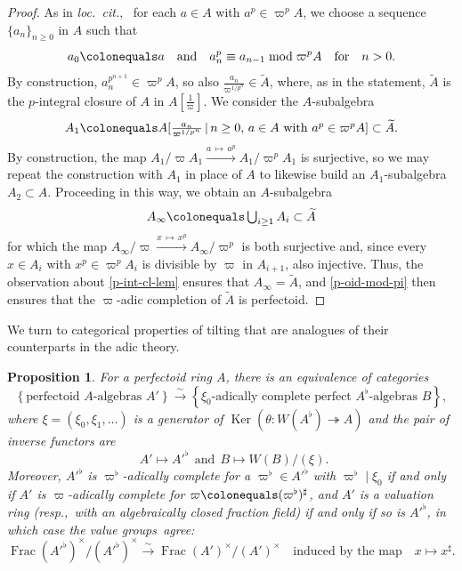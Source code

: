 \documentclass[11pt, reqno]{amsart}
\DeclareMathOperator{\Frac}{Frac}		%
\DeclareMathOperator{\Ker}{Ker}		%
\newcommand{\ce}{\colonequals}
\newcommand{\isomto}{\overset{\sim}{\longrightarrow}}
\newcommand{\surjects}{\twoheadrightarrow}
\newcommand{\wt}{\widetilde}
\newcommand{\xra}{\xrightarrow}
\providecommand{\up}[1]{{\upshape(}#1{\upshape)}}
\providecommand{\f}[2]{\frac{#1}{#2}}
\providecommand{\ucolon}{{\upshape:} }
\newcommand{\x}{\text}
\providecommand{\qxq}[1]{\quad\text{#1}\quad}
\newcommand{\q}{\quad}
\newcommand{\tst}{\textstyle}
\newcommand{\bpf}{\begin{proof}}
\newcommand{\epf}{\end{proof}}
\newcommand{\bprop}{\begin{prop}}
\newcommand{\eprop}{\end{prop}}
\numberwithin{equation}{numberingbase}
\theoremstyle{thms}
\newtheorem{prop}[numberingbase]{Proposition}
\theoremstyle{claims}
\theoremstyle{defs}
\theoremstyle{thms}
\theoremstyle{defs}
\theoremstyle{subsection-tweak}
\theoremstyle{subsection-tweak}
\begin{document}
\bpf
As in \emph{loc.~cit.},~ 
for each $a \in A$ with $a^p \in \varpi^pA$, we choose a sequence $\{a_n\}_{n \ge 0}$ in $A$ such that
\[
a_0 \ce a \q \x{and} \q a_n^p \equiv a_{n - 1} \bmod \varpi^pA \q \x{for} \q n > 0. 
\]
By construction, $a_n^{p^{n + 1}} \in \varpi^pA$, so also $\f{a_n}{\varpi^{1/p^{n}}} \in \wt{A}$, %
where, as in the statement, $\wt{A}$ is the $p$-integral closure of $A$ in $A[\f1\varpi]$. We consider the $A$-subalgebra
\[
\tst A_1 \ce A[\f{a_n}{\varpi^{1/p^{n}}}\, \vert \, n \ge 0,\, a \in A \x{ with } a^p \in \varpi^pA] \subset \wt{A}.
\]
By construction, the map $A_1/\varpi A_1 \xra{a\,\mapsto\, a^p} A_1/\varpi^pA_1$ is surjective, so we may repeat the construction with $A_1$ in place of $A$ to likewise build an $A_1$-subalgebra $A_2 \subset A$. Proceeding in this way, we obtain an $A$-subalgebra 
\[
\tst A_\infty \ce \bigcup_{i \ge 1} A_i  \subset \wt{A}
\]
for which the map $A_\infty/\varpi \xra{x\, \mapsto\, x^p} A_\infty/\varpi^p$ is both surjective and, since every $x \in A_i$ with $x^p \in \varpi^pA_i$ is divisible by $\varpi$ in $A_{i + 1}$, also injective. Thus, the observation about \eqref{p-int-cl-lem} ensures that $A_\infty = \wt{A}$, %
and \eqref{p-oid-mod-pi} then ensures that the $\varpi$-adic completion of $\wt{A}$ is perfectoid.
\epf











We turn to categorical properties of tilting that are analogues of their counterparts in the adic theory. %

\bprop \label{tilt-summary}
For a perfectoid ring $A$, there is an equivalence of categories
\[
\left\{\x{perfectoid $A$-algebras $A'$} \right\} \isomto \left\{\x{$\xi_0$-adically complete perfect $A^\flat$-algebras $B$} \right\}\!,
\]
where $\xi = (\xi_0, \xi_1, \dotsc )$ is a generator of $\Ker(\theta \colon  W(A^\flat) \surjects A)$ and the pair of inverse functors are
\[
\ \ A' \mapsto A'^\flat \ \ \x{and}\ \  B \mapsto W(B)/(\xi).
\]
Moreover, $A'^\flat$ is $\varpi^\flat$-adically complete for a $\varpi^\flat \in A'^\flat$ with $\varpi^\flat \mid \xi_0$ if and only if $A'$ is $\varpi$-adically complete for $\varpi \ce (\varpi^\flat)^\sharp$, and 
 $A'$ is a valuation ring \up{resp.,~with an algebraically closed fraction field} if and only if so is $A'^\flat$, in which case the value groups~agree\ucolon
\[
\Frac(A'^\flat)^\times/(A'^\flat)^\times \isomto \Frac(A')^\times/(A')^\times \qxq{induced by the map} x \mapsto x^\sharp.
\]
\eprop
\end{document}
